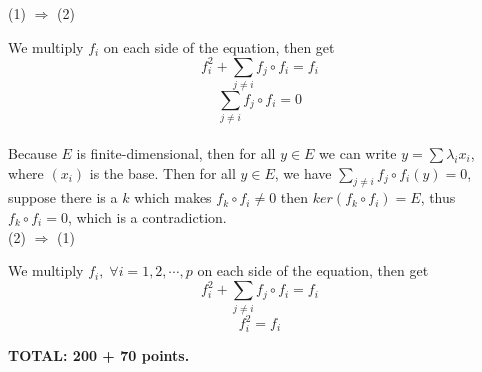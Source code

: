 \documentclass[12pt]{article}
\begin{document}
(1) $\Rightarrow$ (2) 

We multiply $f_i$ on each side of the equation, then get 
\[
f_i^2 + \sum_{j \neq i} f_j \circ f_i = f_i
\]
\[
 \sum_{j \neq i} f_j \circ f_i  = 0
\] \\

Because $E$ is finite-dimensional, then for all $y \in E$ we can write $y = \sum \lambda_i x_i$, where $(x_i)$ is the base. Then for all $y \in E$, we have $ \sum_{j \neq i} f_j \circ f_i (y) = 0$, suppose there is a $k$ which makes $ f_k \circ f_i \neq 0 $ then $ker( f_k \circ f_i ) = E$, thus $ f_k \circ f_i  = 0$, which is a contradiction. \\

(2) $\Rightarrow$ (1)

We multiply $f_i, \; \forall i = 1,2,\cdots, p$ on each side of the equation, then get 
\[
f_i^2 + \sum_{j \neq i} f_j \circ f_i = f_i
\]
\[
 f_i^2 = f_i
\]


\vspace{0.5cm}\noindent
{\bf TOTAL: 200  + 70 points.}
\end{document}

